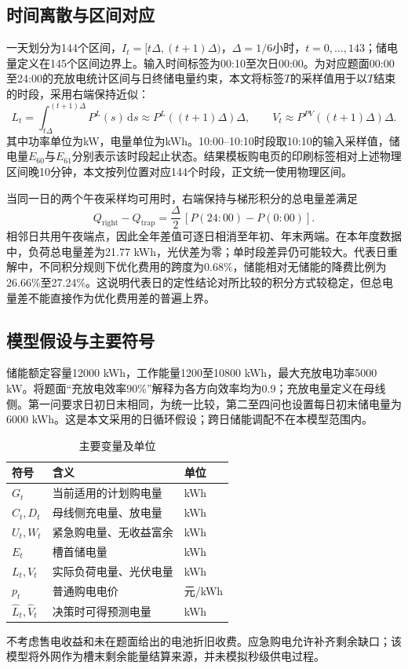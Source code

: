 \documentclass[UTF8,a4paper,zihao=-4,fontset=fandol]{ctexart}
\begin{document}
\subsection{时间离散与区间对应}\label{sec:time}
一天划分为144个区间，$I_t=[t\Delta,(t+1)\Delta)$，$\Delta=1/6$小时，$t=0,\ldots,143$；储电量定义在145个区间边界上。输入时间标签为00:10至次日00:00。为对应题面00:00至24:00的充放电统计区间与日终储电量约束，本文将标签$T$的采样值用于以$T$结束的时段，采用右端保持近似：
\begin{equation}
L_t=\int_{t\Delta}^{(t+1)\Delta}P^L(s)\,\mathrm ds
\approx P^L((t+1)\Delta)\Delta,\qquad
V_t\approx P^{PV}((t+1)\Delta)\Delta.
\end{equation}
其中功率单位为kW，电量单位为kWh。10:00--10:10时段取10:10的输入采样值，储电量$E_{60}$与$E_{61}$分别表示该时段起止状态。结果模板购电页的印刷标签相对上述物理区间晚10分钟，本文按列位置对应144个时段，正文统一使用物理区间。

当同一日的两个午夜采样均可用时，右端保持与梯形积分的总电量差满足
\begin{equation}\label{eq:gap}
Q_{\mathrm{right}}-Q_{\mathrm{trap}}
=\frac{\Delta}{2}\,[P(24{:}00)-P(0{:}00)].
\end{equation}
相邻日共用午夜端点，因此全年差值可逐日相消至年初、年末两端。在本年度数据中，负荷总电量差为21.77 kWh，光伏差为零；单时段差异仍可能较大。代表日重解中，不同积分规则下优化费用的跨度为0.68\%，储能相对无储能的降费比例为26.66\%至27.24\%。这说明代表日的定性结论对所比较的积分方式较稳定，但总电量差不能直接作为优化费用差的普遍上界。

\subsection{模型假设与主要符号}
储能额定容量12000 kWh，工作能量1200至10800 kWh，最大充放电功率5000 kW。将题面“充放电效率90\%”解释为各方向效率均为0.9；充放电量定义在母线侧。第一问要求日初日末相同，为统一比较，第二至四问也设置每日初末储电量为6000 kWh。这是本文采用的日循环假设；跨日储能调配不在本模型范围内。
\begin{table}[H]\centering\caption{主要变量及单位}
\begin{tabular}{lll}\toprule 符号 & 含义 & 单位\\\midrule
$G_t$ & 当前适用的计划购电量 & kWh\\
$C_t,D_t$ & 母线侧充电量、放电量 & kWh\\
$U_t,W_t$ & 紧急购电量、无收益富余 & kWh\\
$E_t$ & 槽首储电量 & kWh\\
$L_t,V_t$ & 实际负荷电量、光伏电量 & kWh\\
$p_t$ & 普通购电电价 & 元/kWh\\
$\widehat L_t,\widehat V_t$ & 决策时可得预测电量 & kWh\\\bottomrule\end{tabular}
\end{table}
不考虑售电收益和未在题面给出的电池折旧收费。应急购电允许补齐剩余缺口；该模型将外网作为槽末剩余能量结算来源，并未模拟秒级供电过程。
\end{document}
